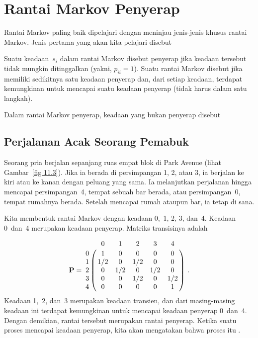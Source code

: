 \section{Rantai Markov Penyerap}\label{sec 11.2}
Rantai Markov paling baik dipelajari dengan meninjau jenis-jenis khusus rantai
Markov. Jenis pertama yang akan kita pelajari disebut 
\begin{definition}
Suatu keadaan~$s_i$ dalam rantai Markov disebut \emx
{penyerap} jika keadaan tersebut
tidak mungkin ditinggalkan (yakni,
$p_{ii} = 1$). Suatu rantai Markov disebut  jika memiliki
sedikitnya satu keadaan penyerap dan, dari setiap keadaan, terdapat kemungkinan
untuk mencapai suatu keadaan penyerap (tidak harus dalam satu langkah).
\end{definition}
\begin{definition}
Dalam rantai Markov penyerap, keadaan yang bukan penyerap disebut
\end{definition}

\subsection*{Perjalanan Acak Seorang Pemabuk}
\begin{example}\label{exam 11.2.1}
Seorang pria berjalan sepanjang ruas empat blok di Park Avenue (lihat
Gambar~\ref{fig 11.3}). Jika ia berada di persimpangan 1, 2, atau 3, ia berjalan
ke kiri atau ke kanan dengan peluang yang sama. Ia melanjutkan perjalanan
hingga mencapai persimpangan~4, tempat sebuah bar berada, atau persimpangan~0,
tempat rumahnya berada. Setelah mencapai rumah ataupun bar, ia tetap di sana.

\par
Kita membentuk rantai Markov dengan keadaan 0,~1, 2, 3, dan~4. Keadaan 0~dan~4
merupakan keadaan penyerap. Matriks transisinya adalah

$$
\mat{P} =\bordermatrix{
  &  0  &  1  &  2  &  3  &  4  \cr
0 &  1  &  0  &  0  &  0  &  0  \cr
1 & 1/2 &  0  & 1/2 &  0  &  0  \cr
2 &  0  & 1/2 &  0  & 1/2 &  0  \cr
3 &  0  &  0  & 1/2 &  0  & 1/2 \cr
4 &  0  &  0  &  0  &  0  &  1 \cr}\ .
$$
Keadaan 1,~2, dan~3 merupakan keadaan transien, dan dari masing-masing keadaan
ini terdapat kemungkinan untuk mencapai keadaan penyerap 0~dan~4. Dengan
demikian, rantai tersebut merupakan rantai penyerap. Ketika suatu proses
mencapai keadaan penyerap, kita akan mengatakan bahwa proses itu
.
\end{example}

